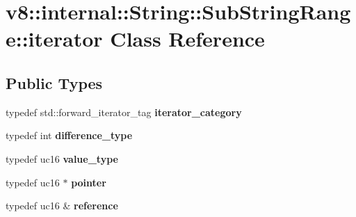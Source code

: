 \hypertarget{classv8_1_1internal_1_1_string_1_1_sub_string_range_1_1iterator}{}\section{v8\+:\+:internal\+:\+:String\+:\+:Sub\+String\+Range\+:\+:iterator Class Reference}
\label{classv8_1_1internal_1_1_string_1_1_sub_string_range_1_1iterator}
\subsection*{Public Types}
\begin{DoxyCompactItemize}
\item 
typedef std\+::forward\+\_\+iterator\+\_\+tag {\bfseries iterator\+\_\+category}\hypertarget{classv8_1_1internal_1_1_string_1_1_sub_string_range_1_1iterator_a4759ef7f4b4ffa8c7d2546556966569f}{}\label{classv8_1_1internal_1_1_string_1_1_sub_string_range_1_1iterator_a4759ef7f4b4ffa8c7d2546556966569f}

\item 
typedef int {\bfseries difference\+\_\+type}\hypertarget{classv8_1_1internal_1_1_string_1_1_sub_string_range_1_1iterator_a66b3fc0738c801cedb1148798461136b}{}\label{classv8_1_1internal_1_1_string_1_1_sub_string_range_1_1iterator_a66b3fc0738c801cedb1148798461136b}

\item 
typedef uc16 {\bfseries value\+\_\+type}\hypertarget{classv8_1_1internal_1_1_string_1_1_sub_string_range_1_1iterator_abb7c567e5f9b4cca88e56bf75b962c05}{}\label{classv8_1_1internal_1_1_string_1_1_sub_string_range_1_1iterator_abb7c567e5f9b4cca88e56bf75b962c05}

\item 
typedef uc16 $\ast$ {\bfseries pointer}\hypertarget{classv8_1_1internal_1_1_string_1_1_sub_string_range_1_1iterator_aaec4c148f2a7f70b53c8ce653068e6f1}{}\label{classv8_1_1internal_1_1_string_1_1_sub_string_range_1_1iterator_aaec4c148f2a7f70b53c8ce653068e6f1}

\item 
typedef uc16 \& {\bfseries reference}\hypertarget{classv8_1_1internal_1_1_string_1_1_sub_string_range_1_1iterator_ac10dfc46cd6de6fd6388dce663f5cfb8}{}\label{classv8_1_1internal_1_1_string_1_1_sub_string_range_1_1iterator_ac10dfc46cd6de6fd6388dce663f5cfb8}

\end{DoxyCompactItemize}
